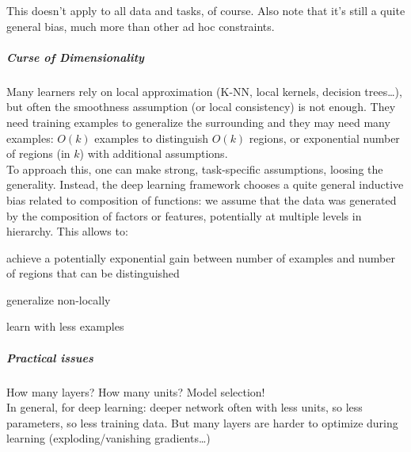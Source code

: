\documentclass[10pt]{report}
\begin{document}
This doesn't apply to all data and tasks, of course. Also note that it's still a quite general bias, much more than other ad hoc constraints.
\subparagraph{Curse of Dimensionality} Many learners rely on local approximation (K-NN, local kernels, decision trees\ldots), but often the smoothness assumption (or local consistency) is not enough. They need training examples to generalize the surrounding and they may need many examples: $O(k)$ examples to distinguish $O(k)$ regions, or exponential number of regions (in $k$) with additional assumptions.\\
To approach this, one can make strong, task-specific assumptions, loosing the generality. Instead, the deep learning framework chooses a quite general inductive bias related to composition of functions: we assume that the data was generated by the composition of factors or features, potentially at multiple levels in hierarchy. This allows to:\begin{list}{}{}
	\item achieve a potentially exponential gain between number of examples and number of regions that can be distinguished
	\item generalize non-locally
	\item learn with less examples
\end{list}
\subparagraph{Practical issues} How many layers? How many units? Model selection!\\
In general, for deep learning: deeper network often with less units, so less parameters, so less training data. But many layers are harder to optimize during learning (exploding/vanishing gradients\ldots)
\end{document}
